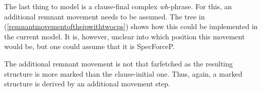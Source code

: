 The last thing to model is a clause-final complex \textit{wh}-phrase. For this, an additional remnant movement needs to be assumed. The tree in (\ref{remnantmovementoftheipwithtwocps}) shows how this could be implemented in the current model. It is, however, unclear into which position this movement would be, but one could assume that it is SpecForceP. 

\begin{exe}
\ex\label{remnantmovementoftheipwithtwocps}
\begin{adjustbox}{max width=0.80\textwidth}
\end{adjustbox}
\end{exe}

\vspace{-0.8cm}

\noindent The additional remnant movement is not that farfetched as the resulting structure is more marked than the clause-initial one. Thus, again, a marked structure is derived by an additional movement step.

